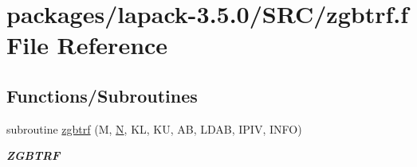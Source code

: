 \hypertarget{zgbtrf_8f}{}\section{packages/lapack-\/3.5.0/\+S\+R\+C/zgbtrf.f File Reference}
\label{zgbtrf_8f}
\subsection*{Functions/\+Subroutines}
\begin{DoxyCompactItemize}
\item 
subroutine \hyperlink{group__complex16GBcomputational_ga9b98a0ba02d0dc89be7ac6319a29755d}{zgbtrf} (M, \hyperlink{polmisc_8c_a0240ac851181b84ac374872dc5434ee4}{N}, K\+L, K\+U, A\+B, L\+D\+A\+B, I\+P\+I\+V, I\+N\+F\+O)
\begin{DoxyCompactList}\small\item\em {\bfseries Z\+G\+B\+T\+R\+F} \end{DoxyCompactList}\end{DoxyCompactItemize}

